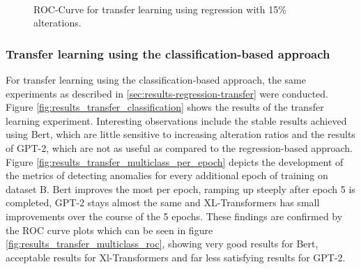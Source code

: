 \begin{figure*}[ht!]
\hspace{\fill}
\hspace{\fill}
   \\
\caption{\label{fig:results_transfer_regression_roc}ROC-Curve for transfer learning using regression with 15\% alterations.}
\end{figure*}



\subsubsection{Transfer learning using the classification-based approach \label{sec:results-classification-transfer}}

For transfer learning using the classification-based approach, the same experiments as described in \ref{sec:results-regression-transfer} were conducted. Figure \ref{fig:results_transfer_classification} shows the results of the transfer learning experiment. Interesting observations include the stable results achieved using Bert, which are little sensitive to increasing alteration ratios and the results of GPT-2, which are not as useful as compared to the regression-based approach.
Figure \ref{fig:results_transfer_multiclass_per_epoch} depicts the development of the metrics of detecting anomalies for every additional epoch of training on dataset B. Bert improves the most per epoch, ramping up steeply after epoch 5 is completed, GPT-2 stays almost the same and XL-Transformers has small improvements over the course of the 5 epochs. These findings are confirmed by the ROC curve plots which can be seen in figure \ref{fig:results_transfer_multiclass_roc}, showing very good results for Bert,  acceptable results for Xl-Transformers and far less satisfying results for GPT-2.

